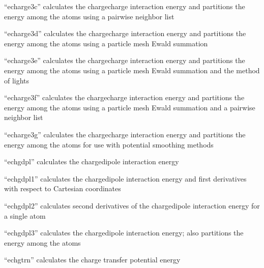\documentclass[letterpaper,11pt,english]{sphinxmanual}
\begin{document}

“echarge3c” calculates the charge\sphinxhyphen{}charge interaction energy
and partitions the energy among the atoms using a pairwise
neighbor list


“echarge3d” calculates the charge\sphinxhyphen{}charge interaction energy
and partitions the energy among the atoms using a particle
mesh Ewald summation


“echarge3e” calculates the charge\sphinxhyphen{}charge interaction energy
and partitions the energy among the atoms using a particle
mesh Ewald summation and the method of lights


“echarge3f” calculates the charge\sphinxhyphen{}charge interaction energy
and partitions the energy among the atoms using a particle
mesh Ewald summation and a pairwise neighbor list


“echarge3g” calculates the charge\sphinxhyphen{}charge interaction energy
and partitions the energy among the atoms for use with
potential smoothing methods


“echgdpl” calculates the charge\sphinxhyphen{}dipole interaction energy


“echgdpl1” calculates the charge\sphinxhyphen{}dipole interaction energy
and first derivatives with respect to Cartesian coordinates


“echgdpl2” calculates second derivatives of the
charge\sphinxhyphen{}dipole interaction energy for a single atom


“echgdpl3” calculates the charge\sphinxhyphen{}dipole interaction energy;
also partitions the energy among the atoms


“echgtrn” calculates the charge transfer potential energy

\end{document}
